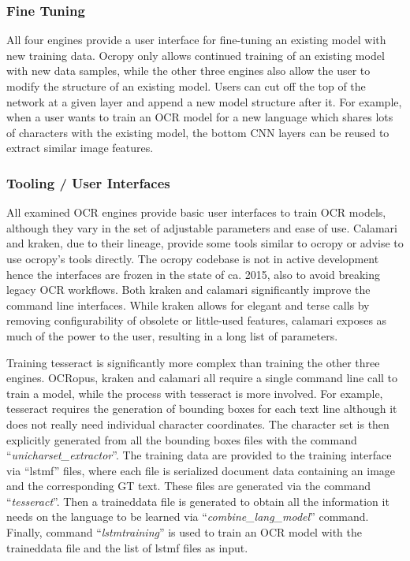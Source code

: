 \documentclass[sigconf]{acmart}
\begin{document}
\subsubsection{Fine Tuning}

All four engines provide a user interface for fine-tuning an
existing model with new training data. Ocropy only allows
continued training of an existing model with new data samples,
while the other three engines also allow the user to modify the
structure of an existing model. Users can cut off the top of the 
network at a given layer and append a new model structure after it.
For example, when a user wants to train an OCR model for a new
language which shares lots of characters with the existing model,
the bottom CNN layers can be reused to extract similar image features.

\subsubsection{Tooling / User Interfaces}

All examined OCR engines provide basic user interfaces to
train OCR models, although they vary in the set of adjustable
parameters and ease of use. Calamari and kraken, due to their lineage,
provide some tools similar to ocropy or advise to use ocropy's tools
directly. The ocropy codebase is not in active development hence the interfaces
are frozen in the state of ca. 2015, also to avoid breaking legacy OCR
workflows. Both kraken and calamari significantly improve the command
line interfaces. While kraken allows for elegant and terse calls by
removing configurability of obsolete or little-used features, calamari
exposes as much of the power to the user, resulting in a long list
of parameters.


Training tesseract is significantly more complex than training the other three engines. 
OCRopus, kraken and calamari all require a single command line call to train
a model, while the process with tesseract is more involved.
For example, tesseract requires the generation of bounding boxes for each text 
line although it does not really need individual character coordinates. 
The character set is then explicitly generated from all the bounding boxes files with the
command ``\textit{unicharset\_extractor}''. The training data are
provided to the training interface via ``lstmf'' files, where each
file is serialized document data containing an image and the
corresponding GT text. These files are generated via the
command ``\textit{tesseract}''. Then a traineddata file is generated
to obtain all the information it needs on the language to be
learned via ``\textit{combine\_lang\_model}'' command. Finally,
command ``\textit{lstmtraining}'' is used to train an OCR model with
the traineddata file and the list of lstmf files as input.
\end{document}
